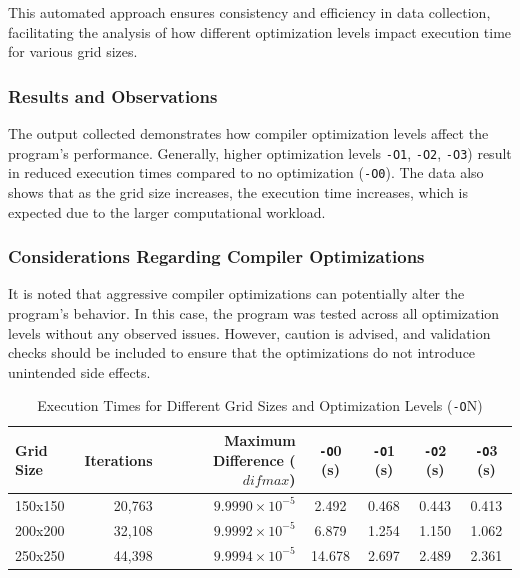 \documentclass{article}
\begin{document}
This automated approach ensures consistency and efficiency in data collection, facilitating the analysis of how different optimization levels impact execution time for various grid sizes.

\subsubsection{Results and Observations}

The output collected demonstrates how compiler optimization levels affect the program's performance. Generally, higher optimization levels \texttt{-O1}, \texttt{-O2}, \texttt{-O3}) result in reduced execution times compared to no optimization (\texttt{-O0}). The data also shows that as the grid size increases, the execution time increases, which is expected due to the larger computational workload.

\subsubsection{Considerations Regarding Compiler Optimizations}

It is noted that aggressive compiler optimizations can potentially alter the program's behavior. In this case, the program was tested across all optimization levels without any observed issues. However, caution is advised, and validation checks should be included to ensure that the optimizations do not introduce unintended side effects.

\begin{table}[H]
    \centering
    \caption{Execution Times for Different Grid Sizes and Optimization Levels (\texttt{-O}N)}
    \label{tab:execution_times}
    \begin{tabular}{lrrcccc}
    \toprule
    \textbf{Grid Size} & \textbf{Iterations} & \textbf{Maximum Difference ($difmax$)} & \textbf{\texttt{-O}0 (s)} & \textbf{\texttt{-O}1 (s)} & \textbf{\texttt{-O}2 (s)} & \textbf{\texttt{-O}3 (s)} \\
    \midrule
    150x150 & 20,763 & $9.9990 \times 10^{-5}$ & 2.492 & 0.468 & 0.443 & 0.413 \\
    200x200 & 32,108 & $9.9992 \times 10^{-5}$ & 6.879 & 1.254 & 1.150 & 1.062 \\
    250x250 & 44,398 & $9.9994 \times 10^{-5}$ & 14.678 & 2.697 & 2.489 & 2.361 \\
    \bottomrule
    \end{tabular}
\end{table}
\end{document}
